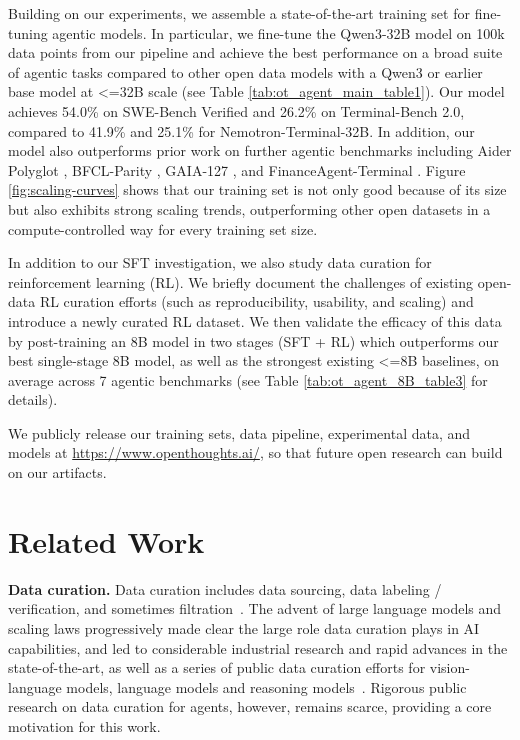 \documentclass{llmxive}
\begin{document}


Building on our experiments, we assemble a state-of-the-art training set for fine-tuning agentic models.
In particular, we fine-tune the Qwen3-32B model on 100k data points from our pipeline and achieve the best performance on a broad suite of agentic tasks compared to other open data models with a Qwen3 or earlier base model at <=32B scale (see Table \ref{tab:ot_agent_main_table1}).
Our model achieves 54.0\% on SWE-Bench Verified and 26.2\% on Terminal-Bench 2.0, compared to 41.9\% and 25.1\% for Nemotron-Terminal-32B.
In addition, our model also outperforms prior work on further agentic benchmarks including Aider Polyglot \citep{aiderpolyglot2024}, BFCL-Parity \citep{patil2025bfcl}, GAIA-127 \citep{mialon2023gaia}, and FinanceAgent-Terminal \citep{valsai2024financeagent}. 
Figure \ref{fig:scaling-curves} shows that our training set is not only good because of its size but also exhibits strong scaling trends, outperforming other open datasets in a compute-controlled way for every training set size.

In addition to our SFT investigation, we also study data curation for reinforcement learning (RL).
We briefly document the challenges of existing open-data RL curation efforts (such as reproducibility, usability, and scaling) and introduce a newly curated RL dataset. We then validate the efficacy of this data by post-training an 8B model in two stages (SFT + RL) which outperforms our best single-stage 8B model, as well as the strongest existing <=8B baselines, on average across 7 agentic benchmarks (see Table \ref{tab:ot_agent_8B_table3} for details).

We publicly release our training sets, data pipeline, experimental data, and models at \url{https://www.openthoughts.ai/}, so that future open research can build on our artifacts.


\vspace{-0.25cm}
\section{Related Work}
\label{sec:related}

\textbf{Data curation.} Data curation includes data sourcing, data labeling / verification, and sometimes filtration~\citep{gadre2023datacompsearchgenerationmultimodal,li2025datacomplmsearchgenerationtraining}. The advent of large language models and scaling laws progressively made clear the large role data curation plays in AI capabilities, and led to considerable industrial research and rapid advances in the state-of-the-art, as well as a series of public data curation efforts for vision-language models, language models and reasoning models~\citep{gadre2023datacompsearchgenerationmultimodal,li2025datacomplmsearchgenerationtraining,guha2025openthoughtsdatarecipesreasoning,bercovich2025llamanemotronefficientreasoningmodels}. Rigorous public research on data curation for agents, however, remains scarce, providing a core motivation for this work.
\end{document}
